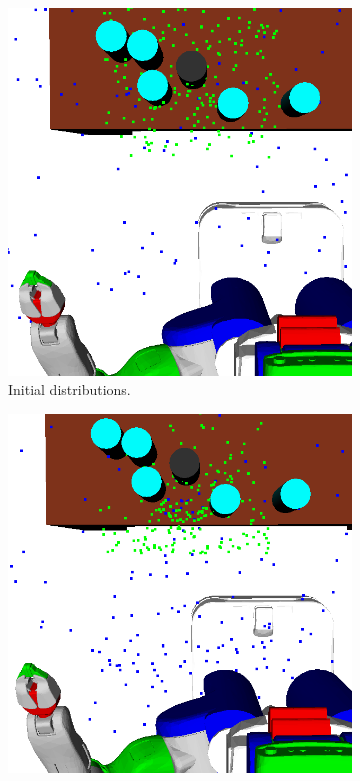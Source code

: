 \begin{figure}[t]
  \centering
  \begin{subfigure}[b]{0.35\linewidth}
    \includegraphics[width=\textwidth]{images/learns.png}
    \caption{Initial distributions.}
  \end{subfigure}
  \begin{subfigure}[b]{0.35\linewidth}
    \includegraphics[width=\textwidth]{images/learn4.png}

\end{subfigure}
\end{figure}
